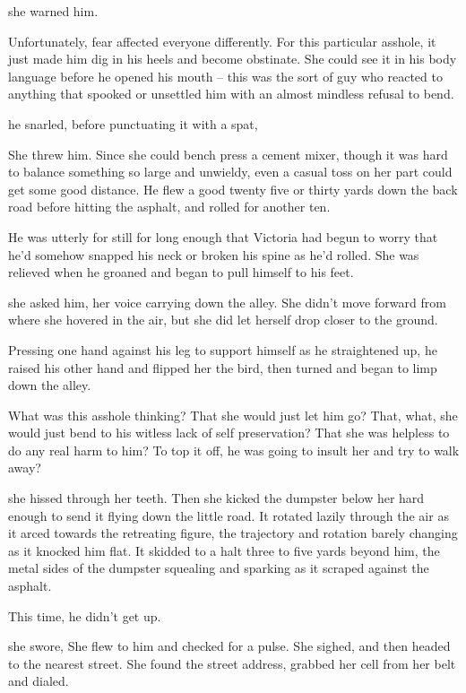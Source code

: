  she warned him.

Unfortunately, fear affected everyone differently. For this particular asshole, it just made him dig in his heels and become obstinate. She could see it in his body language before he opened his mouth -- this was the sort of guy who reacted to anything that spooked or unsettled him with an almost mindless refusal to bend.

 he snarled, before punctuating it with a spat, 

She threw him. Since she could bench press a cement mixer, though it was hard to balance something so large and unwieldy, even a casual toss on her part could get some good distance. He flew a good twenty five or thirty yards down the back road before hitting the asphalt, and rolled for another ten.

He was utterly for still for long enough that Victoria had begun to worry that he'd somehow snapped his neck or broken his spine as he'd rolled. She was relieved when he groaned and began to pull himself to his feet.

 she asked him, her voice carrying down the alley. She didn't move forward from where she hovered in the air, but she did let herself drop closer to the ground.

Pressing one hand against his leg to support himself as he straightened up, he raised his other hand and flipped her the bird, then turned and began to limp down the alley.

What was this asshole thinking? That she would just let him go? That, what, she would just bend to his witless lack of self preservation? That she was helpless to do any real harm to him? To top it off, he was going to insult her and try to walk away?

 she hissed through her teeth. Then she kicked the dumpster below her hard enough to send it flying down the little road. It rotated lazily through the air as it arced towards the retreating figure, the trajectory and rotation barely changing as it knocked him flat. It skidded to a halt three to five yards beyond him, the metal sides of the dumpster squealing and sparking as it scraped against the asphalt.

This time, he didn't get up.

 she swore,  She flew to him and checked for a pulse. She sighed, and then headed to the nearest street. She found the street address, grabbed her cell from her belt and dialed.

